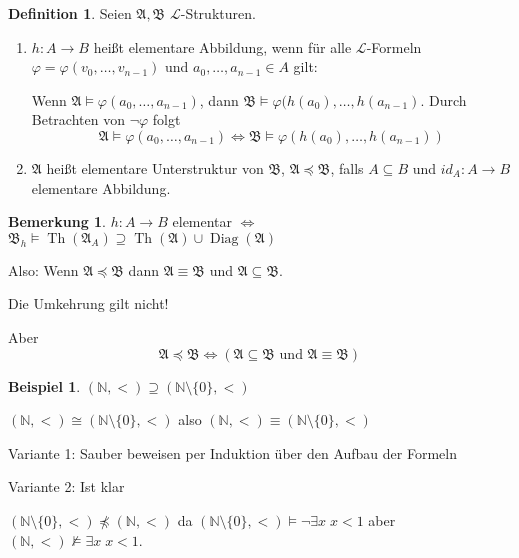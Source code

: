 \documentclass[12pt,parskip=full]{scrartcl}
\newcommand{\setN}{\mathbb{N}}
\theoremstyle{definition}
\newtheorem{definition}[theorem]{Definition}
\newtheorem{example}[theorem]{Beispiel}
\newtheorem{remark}[theorem]{Bemerkung}
\begin{document}
	\begin{definition}
		Seien $\mathfrak{A}, \mathfrak{B}$ $\mathcal{L}$-Strukturen. \begin{enumerate}
			\item $h: A \to B$ heißt elementare Abbildung, wenn für alle $\mathcal{L}$-Formeln $\varphi = \varphi(v_0, \dots, v_{n-1})$ und $a_0, \dots, a_{n-1} \in A$ gilt:
			
			Wenn $\mathfrak{A} \models \varphi(a_0, \dots, a_{n-1})$, dann $\mathfrak{B} \models \varphi(h(a_0), \dots, h(a_{n-1})$. Durch Betrachten von $\lnot \varphi$ folgt
			\begin{equation*}
				\mathfrak{A} \models \varphi(a_0, \dots, a_{n-1}) \Leftrightarrow \mathfrak{B} \models \varphi(h(a_0), \dots, h(a_{n-1}))
			\end{equation*}
			\item $\mathfrak{A}$ heißt elementare Unterstruktur von $\mathfrak{B}$, $\mathfrak{A} \preccurlyeq \mathfrak{B}$, falls $A \subseteq B$ und $id_A: A \to B$ elementare Abbildung.
		\end{enumerate}
	\end{definition}

	\begin{remark}
		$h: A \to B$ elementar $\Leftrightarrow$ $\mathfrak{B}_h \models \operatorname{Th}(\mathfrak{A}_A) \supseteq \operatorname{Th}(\mathfrak{A}) \cup \operatorname{Diag}(\mathfrak{A})$
		
		Also: Wenn $\mathfrak{A} \preccurlyeq \mathfrak{B}$ dann $\mathfrak{A} \equiv \mathfrak{B}$ und $\mathfrak{A} \subseteq \mathfrak{B}$.
		
		Die Umkehrung gilt nicht!
		
		Aber
		\begin{equation*}
			\mathfrak{A} \preccurlyeq \mathfrak{B} \Leftrightarrow (\mathfrak{A} \subseteq \mathfrak{B} \text{ und } \mathfrak{A} \equiv \mathfrak{B})
		\end{equation*}
	\end{remark}

	\begin{example}
		$(\setN, <) \supseteq (\setN \setminus \{ 0 \}, <)$
		
		$(\setN, <) \cong (\setN \setminus \{ 0 \}, <)$ also $(\setN, <) \equiv (\setN \setminus \{ 0 \}, <)$
		
		Variante 1: Sauber beweisen per Induktion über den Aufbau der Formeln
		
		Variante 2: Ist klar
		
		$(\setN \setminus \{ 0 \}, <) \npreceq (\setN, <)$ da $(\setN \setminus \{ 0 \}, <) \models \lnot \exists x \; x < 1$ aber $(\setN, <) \not\models \exists x \; x < 1$.
	\end{example}
\end{document}
